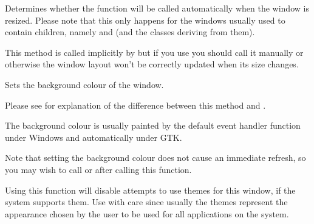 Determines whether the  function will
be called automatically when the window is resized. Please note that this only
happens for the windows usually used to contain children, namely 
 and  
(and the classes deriving from them).

This method is called implicitly by 
 but if you use 
 you should call it
manually or otherwise the window layout won't be correctly updated when its
size changes.






\label{wxwindowsetbackgroundcolour}


Sets the background colour of the window.

Please see  for
explanation of the difference between this method and
.




The background colour is usually painted by the default\rtfsp
{} event handler function
under Windows and automatically under GTK.

Note that setting the background colour does not cause an immediate refresh, so you
may wish to call  or  after
calling this function.

Using this function will disable attempts to use themes for this
window, if the system supports them.  Use with care since usually the
themes represent the appearance chosen by the user to be used for all
applications on the system.


